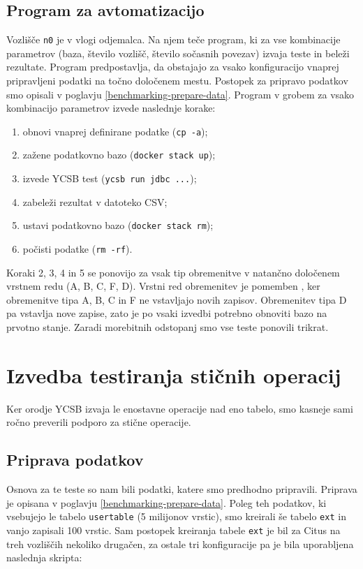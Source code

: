 \documentclass[a4paper, 12pt]{book}
\begin{document}
\subsection{Program za avtomatizacijo}
Vozlišče \texttt{n0} je v vlogi odjemalca. Na njem teče program, ki za vse kombinacije parametrov (baza, število vozlišč, število sočasnih povezav) izvaja teste in beleži rezultate. Program predpostavlja, da obstajajo za vsako konfiguracijo vnaprej pripravljeni podatki na točno določenem mestu. Postopek za pripravo podatkov smo opisali v poglavju \ref{benchmarking-prepare-data}. Program v grobem za vsako kombinacijo parametrov izvede naslednje korake:
\begin{enumerate}
    \item obnovi vnaprej definirane podatke (\texttt{cp -a});
    \item zažene podatkovno bazo (\texttt{docker stack up});
    \item izvede YCSB test (\texttt{ycsb run jdbc ...});
    \item zabeleži rezultat v datoteko CSV;
    \item ustavi podatkovno bazo (\texttt{docker stack rm});
    \item počisti podatke (\texttt{rm -rf}).
\end{enumerate}

\noindent Koraki 2, 3, 4 in 5 se ponovijo za vsak tip obremenitve v natančno določenem vrstnem redu (A, B, C, F, D). Vrstni red obremenitev je pomemben \cite{YCSB-core-workloads}, ker obremenitve tipa A, B, C in F ne vstavljajo novih zapisov. Obremenitev tipa D pa vstavlja nove zapise, zato je po vsaki izvedbi potrebno obnoviti bazo na prvotno stanje. Zaradi morebitnih odstopanj smo vse teste ponovili trikrat.

\newpage
\section{Izvedba testiranja stičnih operacij}
Ker orodje YCSB izvaja le enostavne operacije nad eno tabelo, smo kasneje sami ročno preverili podporo za stične operacije.

\subsection{Priprava podatkov}
Osnova za te teste so nam bili podatki, katere smo predhodno pripravili. Priprava je opisana v poglavju \ref{benchmarking-prepare-data}. Poleg teh podatkov, ki vsebujejo le tabelo \texttt{usertable} (5 milijonov vrstic), smo kreirali še tabelo \texttt{ext} in vanjo zapisali 100 vrstic. Sam postopek kreiranja tabele \texttt{ext} je bil za Citus na treh vozliščih nekoliko drugačen, za ostale tri konfiguracije pa je bila uporabljena naslednja skripta:
\end{document}
